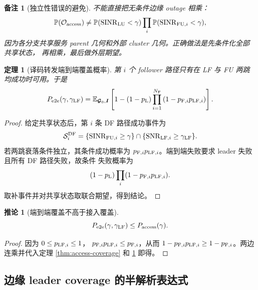 \documentclass[UTF8,a4paper,11pt]{ctexart}
\newtheorem{theorem}{定理}[section]
\newtheorem{corollary}{推论}[section]
\newtheorem{remark}{备注}[section]
\newcommand{\E}{\mathbb E}
\newcommand{\Prob}{\mathbb P}
\newcommand{\NF}{N_{\mathrm F}}
\newcommand{\SINR}{\operatorname{SINR}}
\newcommand{\SNR}{\operatorname{SNR}}
\newcommand{\Pe}{P_{\mathrm{e2e}}}
\newcommand{\Pa}{P_{\mathrm{access}}}
\newcommand{\Ivec}{\bm I}
\newcommand{\Gvec}{\bm{\mathcal G}}
\begin{document}
\begin{remark}[独立性错误的避免]
不能直接把无条件边缘 outage 相乘：
\begin{equation}
 \Prob(\mathcal O_{\rm access})
 \neq
 \Prob(\SINR_{\rm LU}<\gamma)
 \prod_i\Prob(\SINR_{{\rm FU},i}<\gamma),
\end{equation}
因为各分支共享服务 parent 几何和外部 cluster 几何。正确做法是先条件化全部共享状态，
再相乘，最后做外层期望。
\end{remark}

\begin{theorem}[译码转发端到端覆盖概率]
\label{thm:e2e-coverage}
第 $i$ 个 follower 路径只有在 LF 与 FU 两跳均成功时可用。于是
\begin{equation}
 \Pe(\gamma,\gamma_{\rm LF})
 =
 \E_{\Gvec_0,\Ivec}
 \left[
 1-
 (1-p_{\rm L})
 \prod_{i=1}^{\NF}
 \left(
 1-p_{{\rm F},i}p_{{\rm LF},i}
 \right)
 \right].
 \label{eq:e2e-coverage-exact}
\end{equation}
\end{theorem}

\begin{proof}
给定共享状态后，第 $i$ 条 DF 路径成功事件为
\begin{equation}
 \mathcal S_i^{\rm DF}
 =
 \{\SINR_{{\rm FU},i}\geq\gamma\}
 \cap
 \{\SNR_{{\rm LF},i}\geq\gamma_{\rm LF}\}.
\end{equation}
若两跳衰落条件独立，其条件成功概率为
$p_{{\rm F},i}p_{{\rm LF},i}$。端到端失败要求 leader 失败且所有 DF 路径失败，故条件
失败概率为
\begin{equation}
 (1-p_{\rm L})\prod_i(1-p_{{\rm F},i}p_{{\rm LF},i}).
\end{equation}
取补事件并对共享状态取联合期望，得到结论。
\end{proof}

\begin{corollary}[端到端覆盖不高于接入覆盖]
\begin{equation}
 \Pe(\gamma,\gamma_{\rm LF})\leq\Pa(\gamma).
 \label{eq:e2e-less-access}
\end{equation}
\end{corollary}

\begin{proof}
因为 $0\leq p_{{\rm LF},i}\leq1$，
$p_{{\rm F},i}p_{{\rm LF},i}\leq p_{{\rm F},i}$，从而
$1-p_{{\rm F},i}p_{{\rm LF},i}\geq1-p_{{\rm F},i}$。两边连乘并代入定理
\ref{thm:access-coverage} 和 \ref{thm:e2e-coverage} 即得。
\end{proof}

\subsection{边缘 leader coverage 的半解析表达式}
\end{document}
